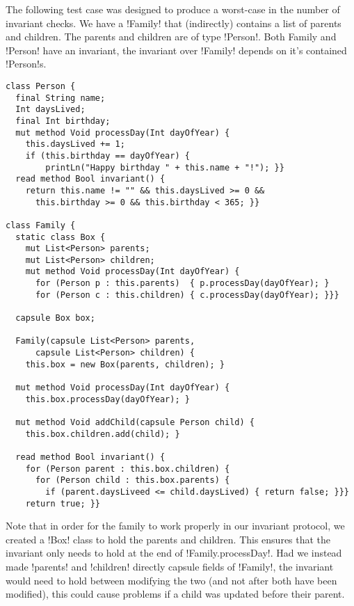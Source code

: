 The following test case was designed to produce a worst-case in the number of invariant checks. We have a \Q!Family! that (indirectly) contains a list of parents and children. The parents and children are of type \Q!Person!. Both Family and \Q!Person! have an invariant, the invariant over \Q!Family! depends on it's contained \Q!Person!s.
\begin{lstlisting}
class Person { 
  final String name;
  Int daysLived;
  final Int birthday; 
  mut method Void processDay(Int dayOfYear) {
  	this.daysLived += 1;
    if (this.birthday == dayOfYear) {
    	printLn("Happy birthday " + this.name + "!"); }}
  read method Bool invariant() {
    return this.name != "" && this.daysLived >= 0 &&
      this.birthday >= 0 && this.birthday < 365; }}

class Family { 
  static class Box { 
    mut List<Person> parents;
    mut List<Person> children;
    mut method Void processDay(Int dayOfYear) {
      for (Person p : this.parents)  { p.processDay(dayOfYear); }
      for (Person c : this.children) { c.processDay(dayOfYear); }}}

  capsule Box box;

  Family(capsule List<Person> parents, 
      capsule List<Person> children) { 
    this.box = new Box(parents, children); }

  mut method Void processDay(Int dayOfYear) { 
    this.box.processDay(dayOfYear); }

  mut method Void addChild(capsule Person child) { 
    this.box.children.add(child); }

  read method Bool invariant() {
    for (Person parent : this.box.children) {
      for (Person child : this.box.parents) {
        if (parent.daysLiveed <= child.daysLived) { return false; }}}
    return true; }}
\end{lstlisting}
Note that in order for the family to work properly in our invariant protocol, we created a \Q!Box! class to hold the parents and children. This ensures that the invariant only needs to hold at the end of \Q!Family.processDay!. Had we instead made \Q!parents! and \Q!children! directly capsule fields of \Q!Family!, the invariant would need to hold between modifying the two (and not after both have been modified), this could cause problems if a child was updated before their parent.

